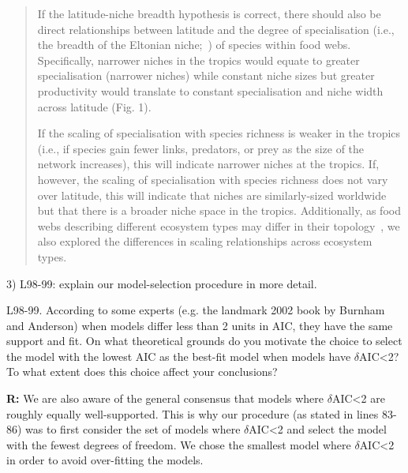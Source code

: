 \documentclass[12pt]{letter}
\newenvironment{refquote}{\bigskip \begin{it}}{\end{it}\smallskip}
\begin{document}
  \begin{quotation}

    If the latitude-niche breadth hypothesis is correct, 
    there should also be direct relationships between 
    latitude and the degree of specialisation (i.e., the 
    breadth of the Eltonian 
    niche;~\cite{Elton1927,Leibold2010}) of species within
    food webs. Specifically, narrower niches in the tropics 
    would equate to greater specialisation (narrower niches) 
    while constant niche sizes but greater productivity 
    would translate to constant specialisation and niche 
    width across latitude (Fig. 1). 

    \smallskip

    If the scaling of specialisation with species richness 
    is weaker in the  tropics (i.e., if species gain fewer
    links, predators, or prey as the size  of the network
    increases), this will indicate narrower niches at the 
    tropics.  If, however, the scaling of specialisation 
    with species richness does not vary over latitude, this 
    will indicate that niches are similarly-sized worldwide 
    but that there is a broader niche space in the tropics. 
    Additionally, as food webs describing different 
    ecosystem types may differ in their 
    topology~\cite{Dunne2004,Shurin2006}, we also explored 
    the differences in scaling relationships across 
    ecosystem types.

  \end{quotation}


  3) L98-99: explain our model-selection procedure in more detail.

  \begin{refquote}

    L98-99. According to some experts (e.g. the landmark 2002 book by Burnham
    and Anderson) when models differ less than 2 units in AIC, they have the
    same support and fit. On what theoretical grounds do you motivate the
    choice to select the model with the lowest AIC as the best-fit model when
    models have $\delta$AIC\textless2? To what extent does this choice affect your
    conclusions?

  \end{refquote}

  \textbf{R:} We are also aware of the general consensus    that models where
  $\delta$AIC\textless2 are roughly equally well-supported. This is why our
  procedure (as stated in lines 83-86) was to first consider the set of models
  where $\delta$AIC\textless2 and select the model with the fewest degrees of
  freedom. We chose the smallest model where $\delta$AIC\textless2 in order to
  avoid over-fitting the models. 
\end{document}
